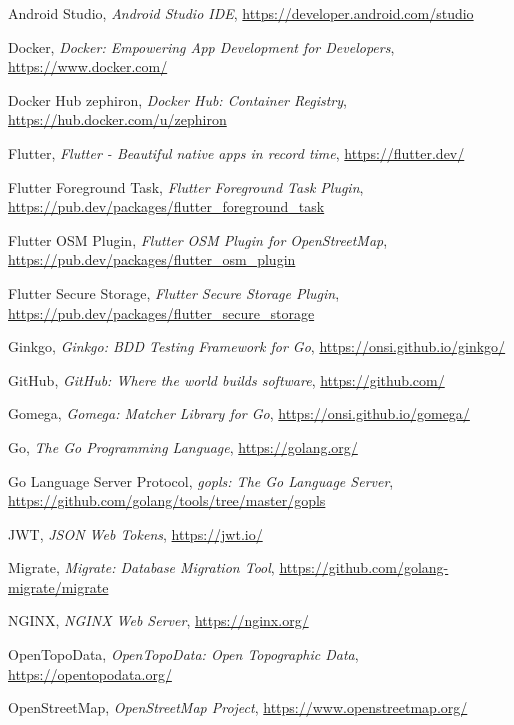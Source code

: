 \documentclass[11pt,a4paper]{article}
\begin{document}
\begin{thebibliography}{9}
Android Studio, \emph{Android Studio IDE}, \url{https://developer.android.com/studio}

Docker, \emph{Docker: Empowering App Development for Developers}, \url{https://www.docker.com/}

Docker Hub zephiron, \emph{Docker Hub: Container Registry}, \url{https://hub.docker.com/u/zephiron}

Flutter, \emph{Flutter - Beautiful native apps in record time}, \url{https://flutter.dev/}

Flutter Foreground Task, \emph{Flutter Foreground Task Plugin}, \url{https://pub.dev/packages/flutter_foreground_task}

Flutter OSM Plugin, \emph{Flutter OSM Plugin for OpenStreetMap}, \url{https://pub.dev/packages/flutter_osm_plugin}

Flutter Secure Storage, \emph{Flutter Secure Storage Plugin}, \url{https://pub.dev/packages/flutter_secure_storage}

Ginkgo, \emph{Ginkgo: BDD Testing Framework for Go}, \url{https://onsi.github.io/ginkgo/}

GitHub, \emph{GitHub: Where the world builds software}, \url{https://github.com/}

Gomega, \emph{Gomega: Matcher Library for Go}, \url{https://onsi.github.io/gomega/}

Go, \emph{The Go Programming Language}, \url{https://golang.org/}

Go Language Server Protocol, \emph{gopls: The Go Language Server}, \url{https://github.com/golang/tools/tree/master/gopls}

JWT, \emph{JSON Web Tokens}, \url{https://jwt.io/}

Migrate, \emph{Migrate: Database Migration Tool}, \url{https://github.com/golang-migrate/migrate}

NGINX, \emph{NGINX Web Server}, \url{https://nginx.org/}

OpenTopoData, \emph{OpenTopoData: Open Topographic Data}, \url{https://opentopodata.org/}

OpenStreetMap, \emph{OpenStreetMap Project}, \url{https://www.openstreetmap.org/}


\end{thebibliography}
\end{document}
